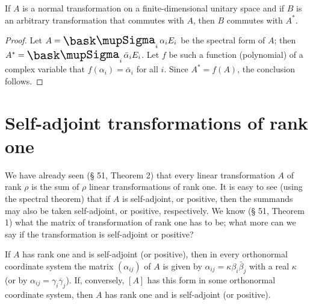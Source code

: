 {\begin{theorem}
    If \(A\) is a normal transformation on a finite-dimensional unitary space
    and if \(B\) is an arbitrary transformation that commutes with \(A\), then
    \(B\) commutes with \(A^*\).
\end{theorem}

\begin{proof}
    Let \(A = \sumx_i \alpha_i E_i\) be the spectral form of \(A\); then \(A^* = \sumx_i \bar{\alpha}_i E_i\). Let \(f\) be such a function (polynomial) of a complex variable that \(f(\alpha_i) = \bar{\alpha}_i\) for all \(i\). Since \(A^* = f(A)\), the conclusion follows.
\end{proof}

\section{Self-adjoint transformations of rank one}

We have already seen (§ 51, Theorem 2) that every linear transformation \(A\) of rank \(\rho\) is the sum of \(\rho\) linear transformations of rank one. It is easy to see (using the spectral theorem) that if \(A\) is self-adjoint, or positive, then the summands may also be taken self-adjoint, or positive, respectively. We know (§ 51, Theorem 1) what the matrix of transformation of rank one has to be; what more can we say if the transformation is self-adjoint or positive?

\begin{theorem}
    If \(A\) has rank one and is self-adjoint (or positive), then in every orthonormal coordinate system the matrix \((\alpha_{ij})\) of \(A\) is given by \(\alpha_{ij} = \kappa\beta_i\bar{\beta}_j\) with a real \(\kappa\) (or by \(\alpha_{ij} = \gamma_i\overline{\gamma}_j\)). If, conversely, \([A]\) has this form in some orthonormal coordinate system, then \(A\) has rank one and is self-adjoint (or positive).
\end{theorem}

}
